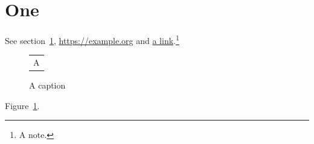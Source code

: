 \documentclass{article}
\begin{document}
\tableofcontents
\section{One}\label{one}
See section~\ref{one}, \url{https://example.org} and \href{https://example.com}{a link}.\footnote{A note.}
\begin{figure}[h]\centering\begin{tabular}{c}A\end{tabular}\caption{A caption}\label{f}\end{figure}
Figure~\ref{f}.
\end{document}
